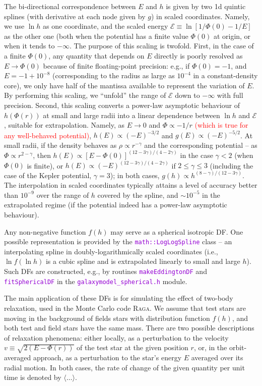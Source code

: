 \documentclass[12pt]{article}
\newcommand{\Raga} {\textsc{Raga}\xspace}
\newcommand{\ttt}[1]{\textcolor{darkviolet}{\texttt{#1}}}
\newcommand{\scE}{\mathscr E}
\begin{document}
The bi-directional correspondence between $E$ and $h$ is given by two 1d quintic splines (with derivative at each node given by $g$) in scaled coordinates. Namely, we use $\ln h$ as one coordinate, and the scaled energy $\scE \equiv \ln[1/\Phi(0) - 1/E]$ as the other one (both when the potential has a finite value $\Phi(0)$ at origin, or when it tends to $-\infty$. The purpose of this scaling is twofold. First, in the case of a finite $\Phi(0)$, any quantity that depends on $E$ directly is poorly resolved as $E\to \Phi(0)$ because of finite floating-point precision: e.g., if $\Phi(0)=-1$, and $E=-1+10^{-8}$ (corresponding to the radius as large as $10^{-4}$ in a constant-density core), we only have half of the mantissa available to represent the variation of $E$. By performing this scaling, we ``unfold'' the range of $\scE$ down to $-\infty$ with full precision. Second, this scaling converts a power-law asymptotic behaviour of $h(\Phi(r))$ at small and large radii into a linear dependence between $\ln h$ and $\scE$, suitable for extrapolation. Namely, as $E \to 0$ and $\Phi \propto -1/r$ \textcolor{red}{(which is true for any well-behaved potential)}, $h(E)\propto (-E)^{-3/2}$ and $g(E)\propto (-E)^{-5/2}$. At small radii, if the density behaves as $\rho \propto r^{-\gamma}$ and the corresponding potential -- as $\Phi \propto r^{2-\gamma}$, then $h(E) \propto [E-\Phi(0)]^{(12-3\gamma)/(4-2\gamma)}$ in the case $\gamma<2$ (when $\Phi(0)$ is finite), or $h(E) \propto (-E)^{(12-3\gamma)/(4-2\gamma)}$ if $2\le \gamma \le 3$ (including the case of the Kepler potential, $\gamma=3$); in both cases, $g(h) \propto h^{(8-\gamma)/(12-3\gamma)}$.
The interpolation in scaled coordinates typically attains a level of accuracy better than $10^{-9}$ over the range of $h$ covered by the spline, and $\sim 10^{-5}$ in the extrapolated regime (if the potential indeed has a power-law asymptotic behaviour).

Any non-negative function $f(h)$ may serve as a spherical isotropic DF. One possible representation is provided by the \ttt{math::LogLogSpline} class -- an interpolating spline in doubly-logarithmically scaled coordinates (i.e., $\ln f (\ln h)$ is a cubic spline and is extrapolated linearly to small and large $h$). Such DFs are constructed, e.g., by routines \ttt{makeEddingtonDF} and \ttt{fitSphericalDF} in the \ttt{galaxymodel_spherical.h} module.

The main application of these DFs is for simulating the effect of two-body relaxation, used in the Monte Carlo code \Raga \cite{Vasiliev2015}. We assume that test stars are moving in the background of fields stars with distribution function $f(h)$, and both test and field stars have the same mass. There are two possible descriptions of relaxation phenomena: either locally, as a perturbation to the velocity $v\equiv \sqrt{2(E-\Phi(r))}$ of the test star at the given position $r$, or, in the orbit-averaged approach, as a perturbation to the star's energy $E$ averaged over its radial motion.
In both cases, the rate of change of the given quantity per unit time is denoted by $\langle \dots \rangle$.
\end{document}

